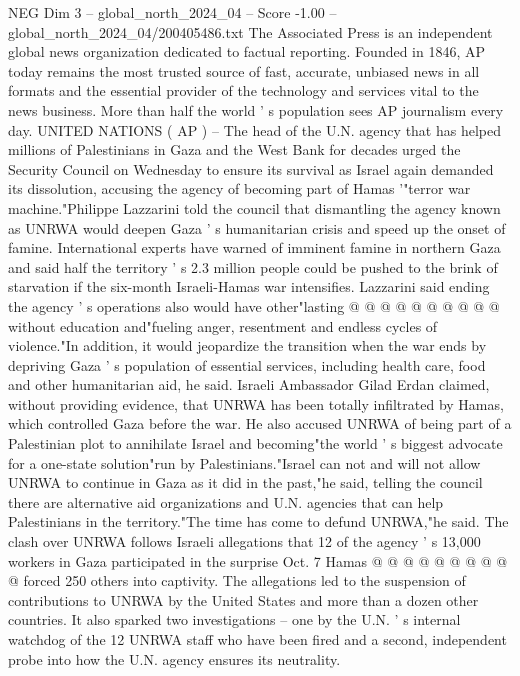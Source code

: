 \begin{textsample}{NEG Dim 3 – global\_north\_2024\_04 – Score -1.00 – global\_north\_2024\_04/200405486.txt}  \label{ex:f3_neg_383}
The Associated Press is an independent global news organization dedicated to factual reporting.
Founded in 1846, AP today remains the most trusted source of fast, accurate, unbiased news in all formats and the essential provider of the technology and services vital to the news business.
More than half the world ' s population sees AP journalism every day.
UNITED NATIONS ( AP ) -- The head of the U.N. agency that has helped millions of Palestinians in Gaza and the West Bank for decades urged the Security Council on Wednesday to ensure its survival as Israel again demanded its dissolution, accusing the agency of becoming part of Hamas '"terror war machine."Philippe Lazzarini told the council that dismantling the agency known as UNRWA would deepen Gaza ' s humanitarian crisis and speed up the onset of famine.
International experts have warned of imminent famine in northern Gaza and said half the territory ' s 2.3 million people could be pushed to the brink of starvation if the six-month Israeli-Hamas war intensifies.
Lazzarini said ending the agency ' s operations also would have other"lasting @ @ @ @ @ @ @ @ @ @ without education and"fueling anger, resentment and endless cycles of violence."In addition, it would jeopardize the transition when the war ends by depriving Gaza ' s population of essential services, including health care, food and other humanitarian aid, he said.
Israeli Ambassador Gilad Erdan claimed, without providing evidence, that UNRWA has been totally infiltrated by Hamas, which controlled Gaza before the war.
He also accused UNRWA of being part of a Palestinian plot to annihilate Israel and becoming"the world ' s biggest advocate for a one-state solution"run by Palestinians."Israel can not and will not allow UNRWA to continue in Gaza as it did in the past,"he said, telling the council there are alternative aid organizations and U.N. agencies that can help Palestinians in the territory."The time has come to defund UNRWA,"he said.
The clash over UNRWA follows Israeli allegations that 12 of the agency ' s 13,000 workers in Gaza participated in the surprise Oct. 7 Hamas @ @ @ @ @ @ @ @ @ @ forced 250 others into captivity.
The allegations led to the suspension of contributions to UNRWA by the United States and more than a dozen other countries.
It also sparked two investigations -- one by the U.N. ' s internal watchdog of the 12 UNRWA staff who have been fired and a second, independent probe into how the U.N. agency ensures its neutrality.

\end{textsample}
